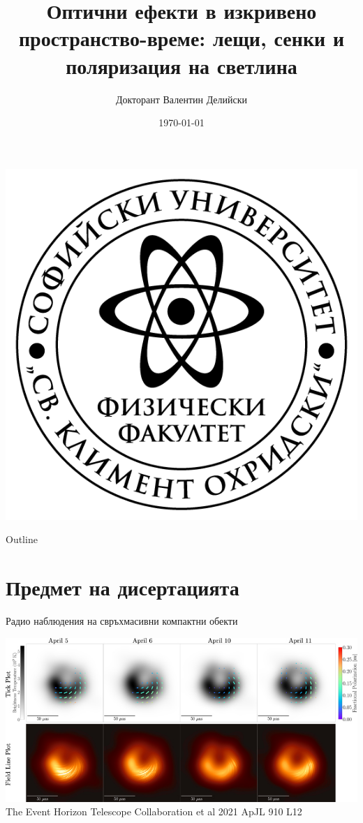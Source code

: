 \documentclass[hyperref={colorlinks,citecolor=blue,linkcolor=blue,urlcolor=blue}]{beamer}
\title[ ]{Оптични ефекти в изкривено пространство-време: лещи, сенки и поляризация на светлина}
\author[В. Делийски]{Докторант Валентин Делийски}
\institute[Теоретична Физика]{Катедра Теоретична Физика, Физически факултет, СУ "св. Климент Охридски"}
\date{\today}
\begin{document}
	
	\begin{frame}
		\titlepage
		\centering	
		\includegraphics[scale = 0.5]{Pre-Defence/logo-FzF.png}
	\end{frame}
	
	\begin{frame}{Outline}
		\tableofcontents
	\end{frame}
	
	\section{Предмет на дисертацията}
	
	\begin{frame}{Радио наблюдения на свръхмасивни компактни обекти}
		
		\centering
		\includegraphics[scale = 0.4]{Pre-Defence/EHT_M87_pol.jpg}\\
		
		\tiny The Event Horizon Telescope Collaboration et al 2021 ApJL 910 L12
		
	\end{frame}
	
\end{document}
